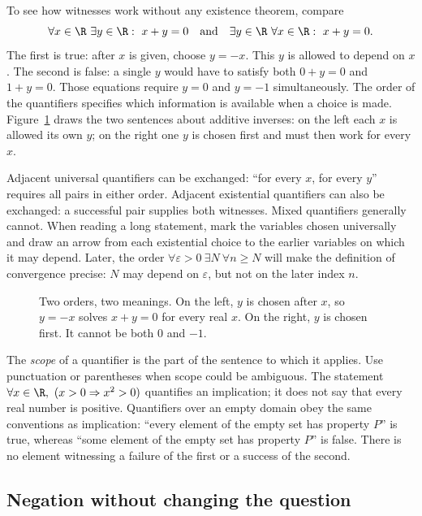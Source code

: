 To see how witnesses work without any existence theorem, compare
\[
\forall x\in\R\ \exists y\in\R:\ x+y=0
\quad\hbox{and}\quad
\exists y\in\R\ \forall x\in\R:\ x+y=0.
\]
The first is true: after $x$ is given, choose $y=-x$. This $y$ is allowed to depend on $x$.
The second is false: a single $y$ would have to satisfy both $0+y=0$ and $1+y=0$.
Those equations require $y=0$ and $y=-1$ simultaneously. The order of the quantifiers
specifies which information is available when a choice is made.
Figure~\ref{fig:lang-quantifiers} draws the two sentences about additive inverses:
on the left each $x$ is allowed its own $y$; on the right one $y$ is chosen first
and must then work for every $x$.

Adjacent universal quantifiers can be exchanged: ``for every $x$, for every $y$''
requires all pairs in either order. Adjacent existential quantifiers can also be
exchanged: a successful pair supplies both witnesses. Mixed quantifiers generally
cannot. When reading a long statement, mark the variables chosen universally and
draw an arrow from each existential choice to the earlier variables on which it may depend.
Later, the order $\forall\varepsilon>0\ \exists N\ \forall n\ge N$ will make the
definition of convergence precise: $N$ may depend on $\varepsilon$, but not on the
later index $n$.

\begin{figure}[ht]
\centering
{}
\caption{Two orders, two meanings. On the left, $y$ is chosen after $x$, so $y=-x$ solves $x+y=0$ for every real $x$. On the right, $y$ is chosen first. It cannot be both $0$ and $-1$.}
\label{fig:lang-quantifiers}
\end{figure}

The \emph{scope} of a quantifier is the part of the sentence to which it applies.
Use punctuation or parentheses when scope could be ambiguous. The statement
$\forall x\in\R,\ (x>0\Rightarrow x^2>0)$ quantifies an implication; it does not
say that every real number is positive. Quantifiers over an empty domain obey the
same conventions as implication: ``every element of the empty set has property $P$''
is true, whereas ``some element of the empty set has property $P$'' is false.
There is no element witnessing a failure of the first or a success of the second.

\subsection*{Negation without changing the question}

